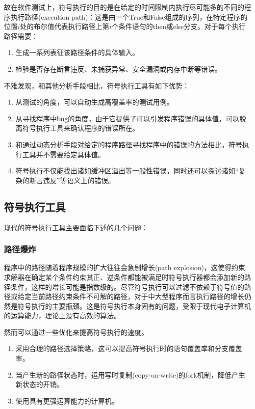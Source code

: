 故在软件测试上，符号执行的目的是在给定的时间限制内执行尽可能多的不同的程序执行路径(execution path)：这是由一个\textmd{True}和\textmd{False}组成的序列，在特定程序的位置$i$处的布尔值代表执行路径上第$i$个条件语句的\textmd{then}或\textmd{else}分支。对于每个执行路径需要：
\begin{enumerate}[label={(\arabic*)}]
\item 生成一系列表征该路径条件的具体输入。
\item 检验是否存在断言违反、未捕获异常、安全漏洞或内存中断等错误。
\end{enumerate}

不难发现，和其他分析手段相比，符号执行工具有如下优势：
\begin{enumerate}
\item 从测试的角度，可以自动生成高覆盖率的测试用例。
\item 从寻找程序中bug的角度，由于它提供了可以引发程序错误的具体值，可以脱离符号执行工具来确认程序的错误所在。
\item 和通过动态分析手段对给定的程序路径寻找程序中的错误的方法相比，符号执行工具并不需要给定具体值。
\item 符号执行不仅能找出诸如缓冲区溢出等一般性错误，同时还可以探讨诸如“复杂的断言违反”等语义上的错误。
\end{enumerate}

\subsection{符号执行工具}
\label{sec:tools}

现代的符号执行工具主要面临下述的几个问题：

\subsubsection{路径爆炸}
程序中的路径随着程序规模的扩大往往会急剧增长(path explosion)，这使得约束求解器在确定某个条件约束其正、逆条件都能被满足时符号执行器都会添加新的路径条件，这样的增长可能是指数级的。尽管符号执行可以过滤不依赖于符号值的路径或给定当前路径约束条件不可解的路径，对于中大型程序而言执行路径的增长仍然是符号执行的主要瓶颈。这是符号执行本身固有的问题，受限于现代电子计算机的运算能力，理论上没有高效的算法。

然而可以通过一些优化来提高符号执行的速度。
\begin{enumerate}
\item 采用合理的路径选择策略，这可以提高符号执行时的语句覆盖率和分支覆盖率。
\item 当产生新的路径状态时，运用写时复制(copy-on-write)的fork机制，降低产生新状态的开销。
\item 使用具有更强运算能力的计算机。
\end{enumerate}

